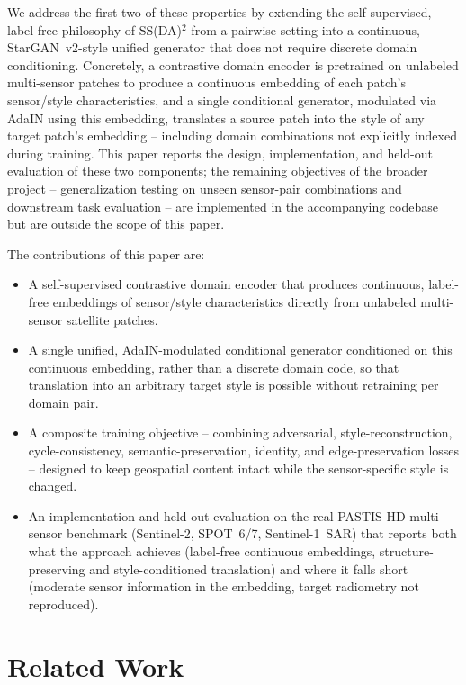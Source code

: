 \documentclass[runningheads]{llncs}
\begin{document}
We address the first two of these properties by extending the self-supervised, label-free philosophy of SS(DA)$^2$ from a pairwise setting into a continuous, StarGAN~v2-style unified generator that does not require discrete domain conditioning. Concretely, a contrastive domain encoder is pretrained on unlabeled multi-sensor patches to produce a continuous embedding of each patch's sensor/style characteristics, and a single conditional generator, modulated via AdaIN using this embedding, translates a source patch into the style of any target patch's embedding -- including domain combinations not explicitly indexed during training. This paper reports the design, implementation, and held-out evaluation of these two components; the remaining objectives of the broader project -- generalization testing on unseen sensor-pair combinations and downstream task evaluation -- are implemented in the accompanying codebase but are outside the scope of this paper.

The contributions of this paper are:
\begin{itemize}
\item A self-supervised contrastive domain encoder that produces continuous, label-free embeddings of sensor/style characteristics directly from unlabeled multi-sensor satellite patches.
\item A single unified, AdaIN-modulated conditional generator conditioned on this continuous embedding, rather than a discrete domain code, so that translation into an arbitrary target style is possible without retraining per domain pair.
\item A composite training objective -- combining adversarial, style-reconstruction, cycle-consistency, semantic-preservation, identity, and edge-preservation losses -- designed to keep geospatial content intact while the sensor-specific style is changed.
\item An implementation and held-out evaluation on the real PASTIS-HD multi-sensor benchmark (Sentinel-2, SPOT~6/7, Sentinel-1~SAR) that reports both what the approach achieves (label-free continuous embeddings, structure-preserving and style-conditioned translation) and where it falls short (moderate sensor information in the embedding, target radiometry not reproduced).
\end{itemize}

\section{Related Work}
\end{document}
